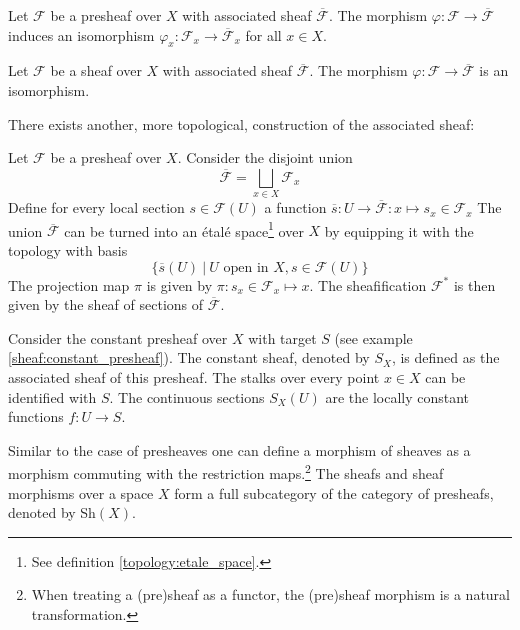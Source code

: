 	\begin{property}
		Let $\mathcal{F}$ be a presheaf over $X$ with associated sheaf $\overline{\mathcal{F}}$. The morphism $\varphi:\mathcal{F}\rightarrow\overline{\mathcal{F}}$ induces an isomorphism $\varphi_x:\mathcal{F}_x\rightarrow\overline{\mathcal{F}}_x$ for all $x\in X$.
	\end{property}
	\begin{property}
		Let $\mathcal{F}$ be a sheaf over $X$ with associated sheaf $\overline{\mathcal{F}}$. The morphism $\varphi:\mathcal{F}\rightarrow\overline{\mathcal{F}}$ is an isomorphism.
	\end{property}
	
	There exists another, more topological, construction of the associated sheaf:
	\begin{construct}\label{sheaf:etale_construction}
		Let $\mathcal{F}$ be a presheaf over $X$. Consider the disjoint union
		\begin{equation}
			\overline{\mathcal{F}} = \bigsqcup_{x\in X}\mathcal{F}_x
		\end{equation}
		Define for every local section $s\in\mathcal{F}(U)$ a function $\overline{s}:U\rightarrow\overline{\mathcal{F}}:x\mapsto s_x\in\mathcal{F}_x$ The union $\overline{\mathcal{F}}$ can be turned into an \'etal\'e space\footnote{See definition \ref{topology:etale_space}.} over $X$ by equipping it with the topology with basis
		\begin{equation}
			\{\overline{s}(U)\ |\ U\text{ open in }X, s\in\mathcal{F}(U)\}
		\end{equation}
		The projection map $\pi$ is given by $\pi:s_x\in\mathcal{F}_x\mapsto x$. The sheafification $\mathcal{F}^\ast$ is then given by the sheaf of sections of $\overline{\mathcal{F}}$.
	\end{construct}
	
	\begin{example}
		Consider the constant presheaf over $X$ with target $S$ (see example \ref{sheaf:constant_presheaf}). The constant sheaf, denoted by $S_X$, is defined as the associated sheaf of this presheaf. The stalks over every point $x\in X$ can be identified with $S$. The continuous sections $S_X(U)$ are the locally constant functions $f:U\rightarrow S$.
	\end{example}
		
	\begin{notation}
		Similar to the case of presheaves one can define a morphism of sheaves as a morphism commuting with the restriction maps.\footnote{When treating a (pre)sheaf as a functor, the (pre)sheaf morphism is a natural transformation.} The sheafs and sheaf morphisms over a space $X$ form a full subcategory of the category of presheafs, denoted by Sh$(X)$.
	\end{notation}
	
